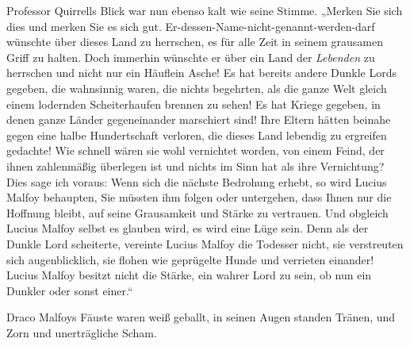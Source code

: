 Professor Quirrells Blick war nun ebenso kalt wie seine Stimme.
„Merken Sie sich dies und merken Sie es sich gut. Er-dessen-Name-nicht-genannt-werden-darf wünschte über dieses Land zu herrschen, es für alle Zeit in seinem grausamen Griff zu halten. Doch immerhin wünschte er über ein Land der \emph{Lebenden} zu herrschen und nicht nur ein Häuflein Asche! Es hat bereits andere Dunkle Lords gegeben, die wahnsinnig waren, die nichts begehrten, als die ganze Welt gleich einem lodernden Scheiterhaufen brennen zu sehen! Es hat Kriege gegeben, in denen ganze Länder gegeneinander marschiert sind! Ihre Eltern hätten beinahe gegen eine halbe Hundertschaft verloren, die dieses Land lebendig zu ergreifen gedachte! Wie schnell wären sie wohl vernichtet worden, von einem Feind, der ihnen zahlenmäßig überlegen ist und nichts im Sinn hat als ihre Vernichtung? Dies sage ich voraus: Wenn sich die nächste Bedrohung erhebt, so wird Lucius Malfoy behaupten, Sie müssten ihm folgen oder untergehen, dass Ihnen nur die Hoffnung bleibt, auf seine Grausamkeit und Stärke zu vertrauen. Und obgleich Lucius Malfoy selbst es glauben wird, es wird eine Lüge sein. Denn als der Dunkle Lord scheiterte, vereinte Lucius Malfoy die Todesser nicht, sie verstreuten sich augenblicklich, sie flohen wie geprügelte Hunde und verrieten einander! Lucius Malfoy besitzt nicht die Stärke, ein wahrer Lord zu sein, ob nun ein Dunkler oder sonst einer.“

Draco Malfoys Fäuste waren weiß geballt, in seinen Augen standen Tränen, und Zorn und unerträgliche Scham.


